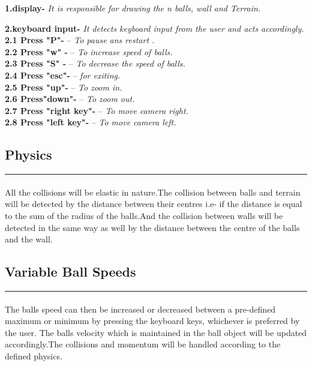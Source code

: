 \documentclass{article}
\begin{document}
    \textbf{1.display-} \textit{It is responsible for drawing the  n balls, wall and Terrain.\\}

	 \textbf{2.keyboard input-}\textit{ It detects keyboard input from the user and
          acts accordingly.\\}
\textbf{2.1 Press "P"-}  – \textit{To pause ans restart .\\}
\textbf{2.2 Press "w" -}  – \textit{To increase speed of balls.\\}
\textbf{2.3 Press "S" -}  – \textit{To decrease the speed of balls.\\}
\textbf{2.4 Press "esc"-}  – \textit{for exiting.\\}
\textbf{2.5 Press "up"-}  – \textit{To zoom in.\\}
\textbf{2.6 Press"down"-}  – \textit{To zoom out.\\}
\textbf{2.7 Press "right key"-}  – \textit{To move camera right.\\}
\textbf{2.8 Press "left key"-}  – \textit{To move camera left.\\}

\newpage
\begin{huge}
\section{Physics}
\noindent
{\color{red} \rule{\linewidth}{0.2mm} }
\end{huge}
\paragraph{}
All the collisions will be elastic in nature.The collision between balls and terrain will be detected by the distance between their centres i.e- if the distance is equal to the sum of the radius of the balls.And the collision between walls will be detected in the same way as well by the distance between the centre of the balls and the wall. 

\begin{huge}
\section{Variable Ball Speeds}
\noindent
{\color{red} \rule{\linewidth}{0.2mm} }
\end{huge}
\paragraph{}
The balls speed can then be increased or decreased between a
pre-defined maximum or minimum by pressing the
keyboard keys, whichever is preferred by the user. The balls velocity which
is maintained in the ball object will be updated accordingly.The collisions and momentum will be handled according to the defined physics.
\end{document}
